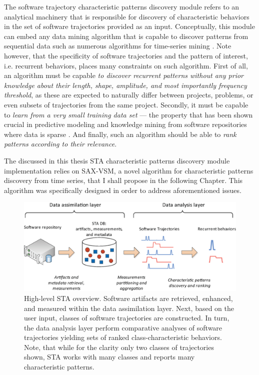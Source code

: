 The software trajectory characteristic patterns discovery module refers to an analytical machinery that 
is responsible for discovery of characteristic behaviors in the set of software trajectories provided as 
an input.
Conceptually, this module can embed any data mining algorithm that is capable to discover patterns from 
sequential data such as numerous algorithms for time-series mining \cite{citeulike:10358271}.
Note however, that the specificity of software trajectories and the pattern of interest, 
i.e. recurrent behaviors, places many constraints on such algorithm.
First of all, an algorithm must be capable 
\textit{to discover recurrent patterns without any prior knowledge about their length, shape, 
amplitude, and most importantly frequency threshold}, as these are expected to 
naturally differ between projects, problems, or even subsets of trajectories from the same project.
Secondly, it must be capable to \textit{learn from a very small training data set} --- 
the property that has been shown crucial in predictive modeling and knowledge mining from software 
repositories where data is sparse \cite{citeulike:6055293}.
And finally, such an algorithm should be able to \textit{rank patterns according to their relevance}.

The discussed in this thesis STA characteristic patterns discovery module implementation relies on SAX-VSM,
a novel algorithm for characteristic patterns discovery from time series, that I shall propose in the 
following Chapter. This algorithm was specifically designed in order to address aforementioned issues.

\begin{figure}[t]
   \centering
   \includegraphics[width=150mm]{figures/Flow-analysis.eps}
   \caption{High-level STA overview. Software artifacts are retrieved, enhanced, and measured within the
   data assimilation layer. Next, based on the user input, classes of software trajectories are constructed.   
   In turn, the data analysis layer perform comparative analyses of software trajectories yielding sets
   of ranked class-characteristic behaviors.
   Note, that while for the clarity only two classes of trajectories shown, STA works with many classes and 
   reports many characteristic patterns.}
   \label{fig:sta-full-overview}
\end{figure}

